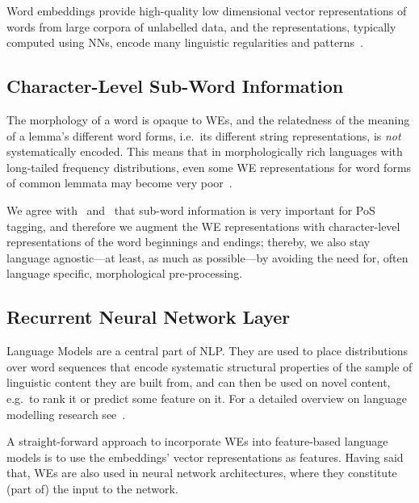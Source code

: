 \documentclass[11pt]{article}
\begin{document}
Word embeddings provide high-quality low dimensional vector representations of
words from large corpora of unlabelled data, and the representations, typically
computed using NNs, encode many linguistic regularities and
patterns~\cite{arXiv:1310.4546}.


\subsection{Character-Level Sub-Word Information} %

The morphology of a word is opaque to WEs, and the relatedness of
the meaning of a lemma's different word forms, i.e.~its different string
representations, is \emph{not} systematically encoded. 
This means that in morphologically rich languages with long-tailed frequency
distributions, even some WE representations for word forms of common
lemmata may become very poor~\cite{DBLP:journals/corr/KimJSR15}.

We agree with~
and~ that sub-word information is very
important for PoS tagging, and therefore we augment the WE representations with
character-level representations of the word beginnings and endings; thereby, we
also stay language agnostic---at least, as much as possible---by avoiding the
need for, often language specific, morphological pre-processing.


\subsection{Recurrent Neural Network Layer} %

Language Models are a central part of NLP.
They are used to place distributions over word sequences that encode systematic
structural properties of the sample of linguistic content they are built from,
and can then be used on novel content, e.g.~to rank it or predict some feature
on it. 
For a detailed overview on language modelling research see~.

A straight-forward approach to incorporate WEs into feature-based
language models is to use the embeddings' vector representations as features.
Having said that, WEs are also used in neural network architectures, where they
constitute (part of) the input to the network. 
\end{document}
